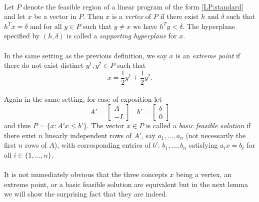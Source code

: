 \paragraph{}
Let $P$ denote the feasible region of a linear program of the form \ref{LP:standard} and let $x$ be a vector in $P$. Then $x$ is a {\it vertex} of $P$ if there exist $h$ and $\delta$ such that $h^Tx = \delta$ and for all $y \in P$
such that $y \neq x$ we have $h^Ty < \delta$. The hyperplane specified by $(h,\delta)$ is called a {\it supporting hyperplane} for $x$.

\paragraph{}In the same setting as the previous definition, we say $x$ is an {\it extreme point} if there do not exist distinct $y^1, y^2 \in P$ such that 
$$ x = \frac{1}{2} y^1 + \frac{1}{2}y^2.$$

\paragraph{}Again in the same setting, for ease of exposition let \begin{equation}A' = \begin{bmatrix} A \\ -I \end{bmatrix} \quad b' = \begin{bmatrix} b \\ 0 \end{bmatrix}\label{LP:augmented}\end{equation} and thus $P = \{x : A'x \leq b'\}$. The vector $x\in P$ is called a {\it basic feasible solution} if there exist $n$ linearly independent rows of $A'$, say $a_1, \dots, a_n$ (not necessarily the first $n$ rows of $A$), with corresponding entries of $b'$: $b_1, \dots, b_n$ satisfying $a_i x = b_i$ for all $i\in \{1,\dots, n\}$.

\paragraph{} It is not immediately obvious that the three concepts $x$ being a vertex, an extreme point, or a basic feasible solution are equivalent but in the next lemma we will show the surprising fact that they are indeed.

